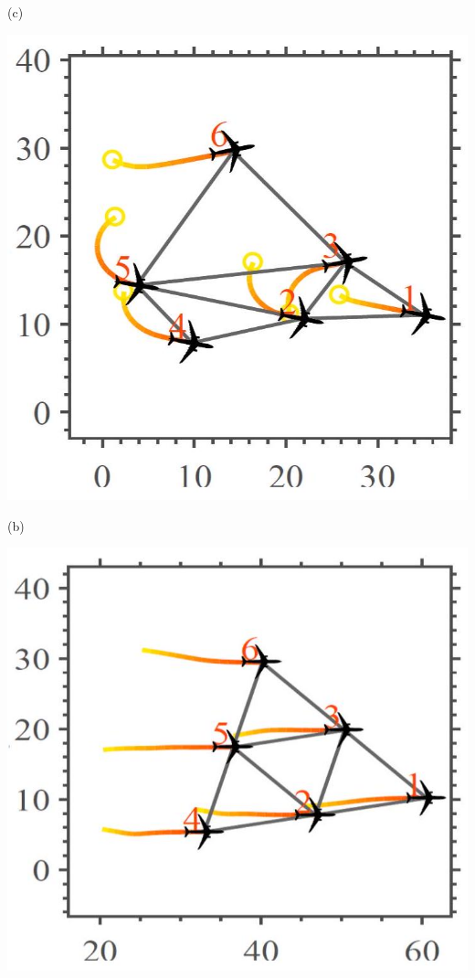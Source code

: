 \documentclass[10pt]{article}
\begin{document}
(c)

\begin{center}
\includegraphics[max width=\textwidth]{2023_10_07_53b70c7408bc8e139415g-38(3)}
\end{center}

(b)

\begin{center}
\includegraphics[max width=\textwidth]{2023_10_07_53b70c7408bc8e139415g-38}
\end{center}
\end{document}
